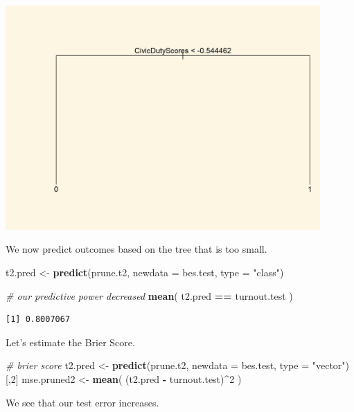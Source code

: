 \documentclass[]{article}
\newenvironment{Shaded}{\begin{snugshade}}{\end{snugshade}}
\newcommand{\CommentTok}[1]{\textcolor[rgb]{0.56,0.35,0.01}{\textit{#1}}}
\newcommand{\DataTypeTok}[1]{\textcolor[rgb]{0.13,0.29,0.53}{#1}}
\newcommand{\DecValTok}[1]{\textcolor[rgb]{0.00,0.00,0.81}{#1}}
\newcommand{\KeywordTok}[1]{\textcolor[rgb]{0.13,0.29,0.53}{\textbf{#1}}}
\newcommand{\NormalTok}[1]{#1}
\newcommand{\OperatorTok}[1]{\textcolor[rgb]{0.81,0.36,0.00}{\textbf{#1}}}
\newcommand{\StringTok}[1]{\textcolor[rgb]{0.31,0.60,0.02}{#1}}
\begin{document}
\includegraphics[width=0.9\textwidth,height=\textheight]{./img/unnamed-chunk-146-1.png}

We now predict outcomes based on the tree that is too small.

\begin{Shaded}
\begin{Highlighting}[]
\NormalTok{t2.pred <-}\StringTok{ }\KeywordTok{predict}\NormalTok{(prune.t2, }\DataTypeTok{newdata =}\NormalTok{ bes.test, }\DataTypeTok{type =} \StringTok{"class"}\NormalTok{)}

\CommentTok{# our predictive power decreased}
\KeywordTok{mean}\NormalTok{( t2.pred }\OperatorTok{==}\StringTok{ }\NormalTok{turnout.test )}
\end{Highlighting}
\end{Shaded}

\begin{verbatim}
[1] 0.8007067
\end{verbatim}

Let's estimate the Brier Score.

\begin{Shaded}
\begin{Highlighting}[]
\CommentTok{# brier score}
\NormalTok{t2.pred <-}\StringTok{ }\KeywordTok{predict}\NormalTok{(prune.t2, }\DataTypeTok{newdata =}\NormalTok{ bes.test, }\DataTypeTok{type =} \StringTok{"vector"}\NormalTok{)[,}\DecValTok{2}\NormalTok{]}
\NormalTok{mse.pruned2 <-}\StringTok{ }\KeywordTok{mean}\NormalTok{( (t2.pred }\OperatorTok{-}\StringTok{ }\NormalTok{turnout.test)}\OperatorTok{^}\DecValTok{2}\NormalTok{ ) }
\end{Highlighting}
\end{Shaded}

We see that our test error increases.
\end{document}
